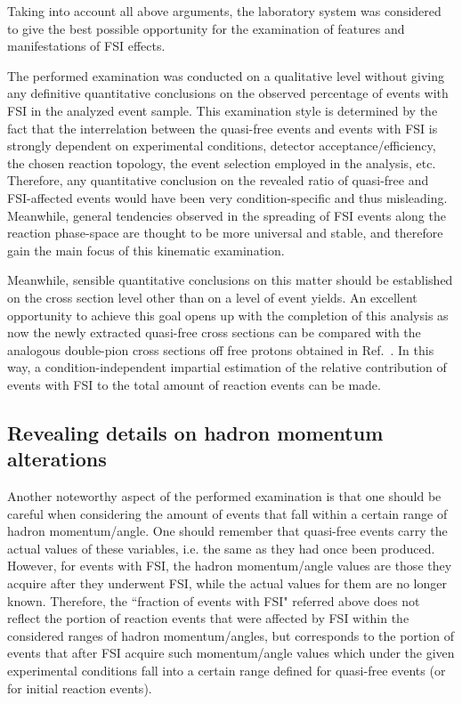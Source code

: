 Taking into account all above arguments, the laboratory system was considered to give the best possible opportunity for the examination of features and manifestations of FSI effects.

The performed examination was conducted on a qualitative level without giving any definitive quantitative conclusions on the observed percentage of events with FSI in the analyzed event sample. This examination style is determined by the fact that the interrelation between the quasi-free events and events with FSI is strongly dependent on experimental conditions, detector acceptance/efficiency, the chosen reaction topology, the event selection employed in the analysis, etc. Therefore, any quantitative conclusion on the revealed ratio of quasi-free and FSI-affected events would have been very condition-specific and thus misleading. Meanwhile, general tendencies observed in the spreading of FSI events along the reaction phase-space are thought to be more universal and stable, and therefore gain the main focus of this kinematic examination. 

Meanwhile, sensible quantitative conclusions on this matter should be established on the cross section level other than on a level of event yields. An excellent opportunity to achieve this goal opens up with the completion of this analysis as now the newly extracted quasi-free cross sections can be compared with the analogous double-pion cross sections off free protons obtained in Ref.~\cite{Fed_an_note:2017,Fed_paper_2018}. In this way, a condition-independent impartial  estimation of the relative contribution of events with FSI to the total amount of reaction events can be made. %



\subsection{Revealing details on hadron momentum alterations}

Another noteworthy aspect of the performed examination is that one should be careful when considering the amount of events that fall within a certain range of hadron momentum/angle. One should remember that quasi-free events carry the actual values of these variables, i.e. the same as they had once been produced. However, for events with FSI, the hadron momentum/angle values are those they acquire after they underwent FSI, while the actual values for them are no longer known. Therefore, the ``fraction of events with FSI" referred above does not reflect the portion of reaction events that were affected by FSI within the considered ranges of hadron momentum/angles, but corresponds to the portion of events that after FSI acquire such momentum/angle values which under the given experimental conditions fall into a certain range defined for quasi-free events (or for initial reaction events). 

